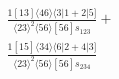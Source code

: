 \documentclass[varwidth, border=5pt]{standalone}
\begin{document}
\begin{my}
$\begin{gathered}
\scriptscriptstyle\frac{1[13]⟨46⟩⟨3|1+2|5]}{⟨23⟩^2⟨56⟩[56]s_{123}}+\\
\scriptscriptstyle\frac{1[15]⟨34⟩⟨6|2+4|3]}{⟨23⟩^2⟨56⟩[56]s_{234}}\phantom{+}
\end{gathered}$
\end{my}
\end{document}

